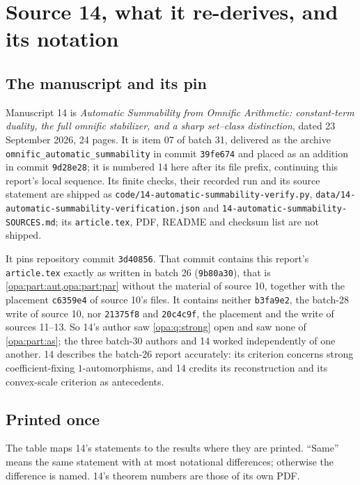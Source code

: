 \documentclass[11pt,oneside]{article}
\numberwithin{equation}{section}
\theoremstyle{definition}
\theoremstyle{remark}
\newcommand{\fn}[1]{\nolinkurl{#1}}
\begin{document}
\section{Source 14, what it re-derives, and its notation}\label{opa:cm:sec:intro}

\subsection{The manuscript and its pin}\label{opa:cm:sub:source}

Manuscript 14 is \emph{Automatic Summability from Omnific Arithmetic: constant-term duality,
the full omnific stabilizer, and a sharp set--class distinction}, dated 23 September 2026,
24 pages. It is item 07 of batch 31, delivered as the archive
\fn{omnific_automatic_summability} in commit \texttt{39fe674} and placed as an addition in
commit \texttt{9d28e28}; it is numbered 14 here after its file prefix, continuing this
report's local sequence. Its finite checks, their recorded run and its source statement are
shipped as \fn{code/14-automatic-summability-verify.py},
\fn{data/14-automatic-summability-verification.json} and
\fn{14-automatic-summability-SOURCES.md}; its \fn{article.tex}, PDF, README and checksum list
are not shipped.

It pins repository commit \texttt{3d40856}. That commit contains this report's
\fn{article.tex} exactly as written in batch 26 (\texttt{9b80a30}), that is
\cref{opa:part:aut,opa:part:par} without the material of source 10, together with the
placement \texttt{c6359e4} of source 10's files. It contains neither \texttt{b3fa9e2}, the
batch-28 write of source 10, nor \texttt{21375f8} and \texttt{20c4c9f}, the placement and
the write of sources 11--13. So 14's author saw \cref{opa:q:strong} open and saw none of
\cref{opa:part:as}; the three batch-30 authors and 14 worked independently of one another.
14 describes the batch-26 report accurately: its criterion concerns strong
coefficient-fixing $1$-automorphisms, and 14 credits its reconstruction and its
convex-scale criterion as antecedents.

\subsection{Printed once}\label{opa:cm:sub:once}

The table maps 14's statements to the results where they are printed. ``Same'' means the
same statement with at most notational differences; otherwise the difference is named.
14's theorem numbers are those of its own PDF.
\end{document}
